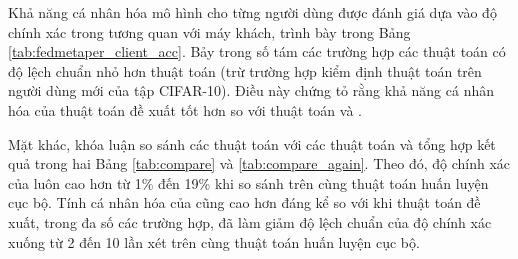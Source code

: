 \begin{table}
    \centering
    \caption{Bảng độ chính xác (\%) của thuật toán FedPer và các thuật toán FedMeta-Per tính trên máy khách (dữ liệu Non-IID)}
    \label{tab:fedmetaper_client_acc}
\end{table}

Khả năng cá nhân hóa mô hình cho từng người dùng được đánh giá dựa vào độ chính xác trong tương quan với máy khách, trình bày trong Bảng \ref{tab:fedmetaper_client_acc}. Bảy trong số tám các trường hợp các thuật toán  có độ lệch chuẩn nhỏ hơn thuật toán  (trừ trường hợp kiểm định thuật toán  trên người dùng mới của tập CIFAR-10). Điều này chứng tỏ rằng khả năng cá nhân hóa của thuật toán đề xuất tốt hơn so với thuật toán  và .

Mặt khác, khóa luận so sánh các thuật toán  với các thuật toán  và tổng hợp kết quả trong hai Bảng \ref{tab:compare} và \ref{tab:compare_again}. Theo đó, độ chính xác của  luôn cao hơn  từ 1\% đến 19\% khi so sánh trên cùng thuật toán huấn luyện cục bộ. Tính cá nhân hóa của  cũng cao hơn đáng kể so với  khi thuật toán đề xuất, trong đa số các trường hợp, đã làm giảm độ lệch chuẩn của độ chính xác xuống từ 2 đến 10 lần xét trên cùng thuật toán huấn luyện cục bộ.

